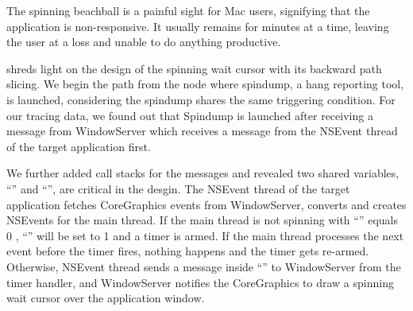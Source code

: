 The spinning beachball is a painful sight for Mac users, signifying that the
application is non-responsive. It usually remains for minutes at a time,
leaving the user at a loss and unable to do anything productive.

\xxx shreds light on the design of the spinning wait cursor with its backward
path slicing. We begin the path from the node where spindump, a hang reporting
tool, is launched, considering the spindump shares the same triggering
condition. For our tracing data, we found out that Spindump is launched after
receiving a message from WindowServer which receives a message from the NSEvent
thread of the target application first.

We further added call stacks for the messages and revealed two shared
variables, ``'' and
``'', are critical in the desgin. The NSEvent
thread of the target application fetches CoreGraphics events from WindowServer,
converts and creates NSEvents for the main thread. If the main thread is not
spinning with ``'' equals 0 ,
``'' will be set to 1 and a timer is armed. If the
main thread processes the next event before the timer fires, nothing happens
and the timer gets re-armed. Otherwise, NSEvent thread sends a message inside
``'' to WindowServer from the timer handler, and
WindowServer notifies the CoreGraphics to draw a spinning wait cursor over the
application window.
